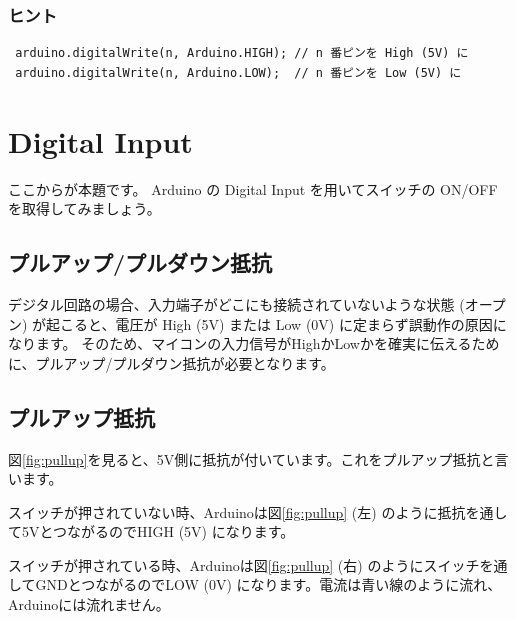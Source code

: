 \documentclass[11pt,a4paper]{jarticle}
\begin{document}
\subsubsection*{ヒント}
\begin{lstlisting}
 arduino.digitalWrite(n, Arduino.HIGH); // n 番ピンを High (5V) に
 arduino.digitalWrite(n, Arduino.LOW);  // n 番ピンを Low (5V) に
\end{lstlisting}


\section{Digital Input}
ここからが本題です。
Arduino の Digital Input を用いてスイッチの ON/OFF を取得してみましょう。

\subsection*{プルアップ/プルダウン抵抗}
デジタル回路の場合、入力端子がどこにも接続されていないような状態 (オープン) が起こると、電圧が High (5V) または Low (0V) に定まらず誤動作の原因になります。
そのため、マイコンの入力信号がHighかLowかを確実に伝えるために、プルアップ/プルダウン抵抗が必要となります。


\subsection{プルアップ抵抗}
図\ref{fig:pullup}を見ると、5V側に抵抗が付いています。これをプルアップ抵抗と言います。
 
スイッチが押されていない時、Arduinoは図\ref{fig:pullup} (左) のように抵抗を通して5VとつながるのでHIGH (5V) になります。

スイッチが押されている時、Arduinoは図\ref{fig:pullup} (右) のようにスイッチを通してGNDとつながるのでLOW (0V) になります。電流は青い線のように流れ、Arduinoには流れません。
\end{document}
